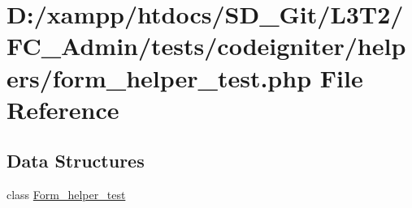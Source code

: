 \hypertarget{_admin_2tests_2codeigniter_2helpers_2form__helper__test_8php}{}\section{D\+:/xampp/htdocs/\+S\+D\+\_\+\+Git/\+L3\+T2/\+F\+C\+\_\+\+Admin/tests/codeigniter/helpers/form\+\_\+helper\+\_\+test.php File Reference}
\label{_admin_2tests_2codeigniter_2helpers_2form__helper__test_8php}
\subsection*{Data Structures}
\begin{DoxyCompactItemize}
\item 
class \hyperlink{class_form__helper__test}{Form\+\_\+helper\+\_\+test}
\end{DoxyCompactItemize}
